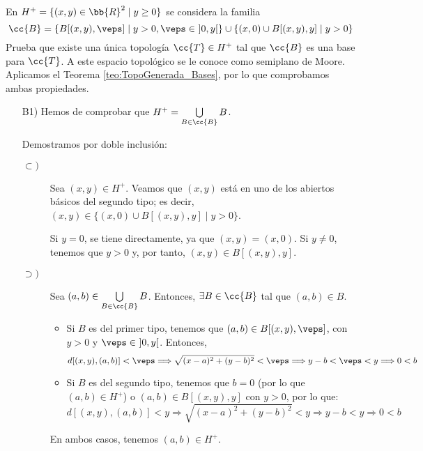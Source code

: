 \begin{ejercicio}
    En $H^+=\{(x,y)\in \bb{R}^2\mid y\geq 0\}$ se considera la familia
    \begin{equation*}
        \cc{B}=\{B[(x,y), \veps]\mid y>0, \veps \in~ ]0,y[\}
        \cup
        \{(x,0)\cup B[(x,y),y]\mid y>0\}
    \end{equation*}
    Prueba que existe una única topología $\cc{T}\in H^+$ tal que $\cc{B}$ es una base para $\cc{T}$. A este espacio topológico se le conoce como semiplano de Moore.\\


    Aplicamos el Teorema \ref{teo:TopoGenerada_Bases}, por lo que comprobamos ambas propiedades.
    \begin{enumerate}
        \item[B1)] Hemos de comprobar que $H^+=\bigcup\limits_{B\in \cc{B}}B$.

        Demostramos por doble inclusión:
        \begin{description}
            \item[$\subset)$] Sea $(x,y)\in H^+$. Veamos que $(x,y)$ está en uno de los abiertos básicos del segundo tipo; es decir, $(x,y)\in \{(x,0)\cup B[(x,y),y]\mid y>0\}$.

            Si $y=0$, se tiene directamente, ya que $(x,y)=(x,0)$. Si $y\neq 0$, tenemos que $y>0$ y, por tanto, $(x,y)\in B[(x,y),y]$.

            \item [$\supset)$] Sea $(a,b)\in \bigcup\limits_{B\in \cc{B}}B$. Entonces, $\exists B\in \cc{B}$ tal que $(a,b)\in B$.
            \begin{itemize}
                \item Si $B$ es del primer tipo, tenemos que $(a,b)\in B[(x,y),\veps]$, con $y>0$ y $\veps\in ~]0,y[$. Entonces,
                $$d[(x,y),(a,b)]<\veps \Longrightarrow \sqrt{(x-a)^2 + (y-b)^2}<\veps \Longrightarrow y-b<\veps <y \Longrightarrow 0<b$$

                \item Si $B$ es del segundo tipo, tenemos que $b=0$ (por lo que $(a,b)\in H^+$) o $(a,b)\in B[(x,y),y]$ con $y>0$, por lo que:
                \begin{equation*}
                    d[(x,y),(a,b)]<y \Longrightarrow \sqrt{(x-a)^2 + (y-b)^2}<y \Longrightarrow y-b<y \Longrightarrow 0<b
                \end{equation*}
            \end{itemize}
            En ambos casos, tenemos $(a,b)\in H^+$.
        \end{description}
        

\end{enumerate}
\end{ejercicio}
